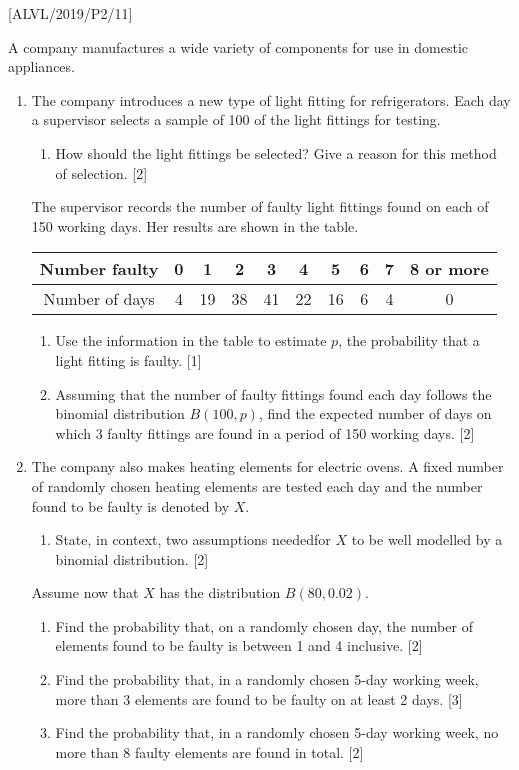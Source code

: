\item {[}ALVL/2019/P2/11{]} 

A company manufactures a wide variety of components for use in domestic
appliances. 
\begin{enumerate}
\item The company introduces a new type of light fitting for refrigerators.
Each day a supervisor selects a sample of 100 of the light fittings
for testing. 
\begin{enumerate}
\item How should the light fittings be selected? Give a reason for this
method of selection. \hfill{} {[}2{]}
\end{enumerate}
The supervisor records the number of faulty light fittings found on
each of 150 working days. Her results are shown in the table. 
\noindent \begin{center}
\begin{tabular}{|c|c|c|c|c|c|c|c|c|c|}
\hline 
Number faulty & 0 & 1 & 2 & 3 & 4 & 5 & 6 & 7 & 8 or more\tabularnewline
\hline 
Number of days & 4 & 19 & 38 & 41 & 22 & 16 & 6 & 4 & 0\tabularnewline
\hline 
\end{tabular}
\par\end{center}
\begin{enumerate}
\item Use the information in the table to estimate $p$, the probability
that a light fitting is faulty. \hfill{} {[}1{]}
\item Assuming that the number of faulty fittings found each day follows
the binomial distribution $B\left(100,p\right)$, find the expected
number of days on which 3 faulty fittings are found in a period of
150 working days. \hfill{}{[}2{]}
\end{enumerate}
\item The company also makes heating elements for electric ovens. A fixed
number of randomly chosen heating elements are tested each day and
the number found to be faulty is denoted by $X$.
\begin{enumerate}
\item State, in context, two assumptions neededfor $X$ to be well modelled
by a binomial distribution. \hfill{}{[}2{]}
\end{enumerate}
Assume now that $X$ has the distribution $B\left(80,0.02\right)$. 
\begin{enumerate}
\item Find the probability that, on a randomly chosen day, the number of
elements found to be faulty is between 1 and 4 inclusive. \hfill{}{[}2{]}
\item Find the probability that, in a randomly chosen 5-day working week,
more than 3 elements are found to be faulty on at least 2 days. \hfill{}{[}3{]}
\item Find the probability that, in a randomly chosen 5-day working week,
no more than 8 faulty elements are found in total. \hfill{} {[}2{]}
\end{enumerate}
\end{enumerate}

